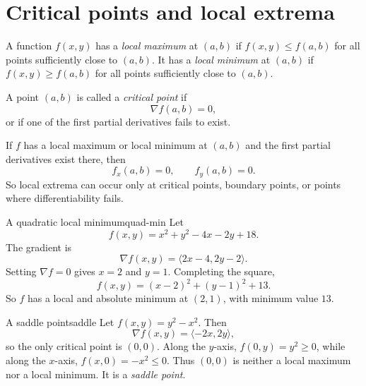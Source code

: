 \documentclass[11pt]{article}
\newcommand{\grad}{\nabla}
\begin{document}
\section{Critical points and local extrema}

A function $f(x,y)$ has a \emph{local maximum} at $(a,b)$ if $f(x,y)\le f(a,b)$ for all points sufficiently close to $(a,b)$. It has a \emph{local minimum} at $(a,b)$ if $f(x,y)\ge f(a,b)$ for all points sufficiently close to $(a,b)$.

A point $(a,b)$ is called a \emph{critical point} if
\[
\grad f(a,b)=0,
\]
or if one of the first partial derivatives fails to exist.

\begin{importantbox}
If $f$ has a local maximum or local minimum at $(a,b)$ and the first partial derivatives exist there, then
\[
f_x(a,b)=0,\qquad f_y(a,b)=0.
\]
So local extrema can occur only at critical points, boundary points, or points where differentiability fails.
\end{importantbox}

\begin{workedexample}{A quadratic local minimum}{quad-min}
Let
\[
f(x,y)=x^2+y^2-4x-2y+18.
\]
The gradient is
\[
\grad f(x,y)=\langle 2x-4,2y-2\rangle.
\]
Setting $\grad f=0$ gives $x=2$ and $y=1$. Completing the square,
\[
f(x,y)=(x-2)^2+(y-1)^2+13.
\]
So $f$ has a local and absolute minimum at $(2,1)$, with minimum value $13$.
\end{workedexample}

\begin{workedexample}{A saddle point}{saddle}
Let $f(x,y)=y^2-x^2$. Then
\[
\grad f(x,y)=\langle -2x,2y\rangle,
\]
so the only critical point is $(0,0)$. Along the $y$-axis, $f(0,y)=y^2\ge 0$, while along the $x$-axis, $f(x,0)=-x^2\le 0$. Thus $(0,0)$ is neither a local maximum nor a local minimum. It is a \emph{saddle point}.
\end{workedexample}
\end{document}
